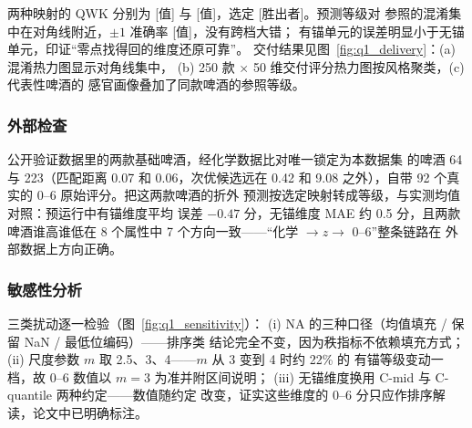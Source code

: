 \documentclass[12pt,a4paper]{article}
\begin{document}
两种映射的 QWK 分别为 [值] 与 [值]，选定 [胜出者]。预测等级对
参照的混淆集中在对角线附近，$\pm1$ 准确率 [值]，没有跨档大错；
有锚单元的误差明显小于无锚单元，印证``零点找得回的维度还原可靠''。
交付结果见图~\ref{fig:q1_delivery}：(a) 混淆热力图显示对角线集中，
(b) 250 款 $\times$ 50 维交付评分热力图按风格聚类，(c) 代表性啤酒的
感官画像叠加了同款啤酒的参照等级。


\subsubsection{外部检查}

公开验证数据里的两款基础啤酒，经化学数据比对唯一锁定为本数据集
的啤酒 64 与 223（匹配距离 0.07 和 0.06，次优候选远在 0.42 和
9.08 之外），自带 92 个真实的 0--6 原始评分。把这两款啤酒的折外
预测按选定映射转成等级，与实测均值对照：预运行中有锚维度平均
误差 $-0.47$ 分，无锚维度 MAE 约 0.5 分，且两款啤酒谁高谁低在
8 个属性中 7 个方向一致——``化学 $\to z\to$ 0--6''整条链路在
外部数据上方向正确。

\subsubsection{敏感性分析}

三类扰动逐一检验（图~\ref{fig:q1_sensitivity}）：
(i) NA 的三种口径（均值填充 / 保留 NaN / 最低位编码）——排序类
结论完全不变，因为秩指标不依赖填充方式；
(ii) 尺度参数 $m$ 取 2.5、3、4——$m$ 从 3 变到 4 时约 22\% 的
有锚等级变动一档，故 0--6 数值以 $m=3$ 为准并附区间说明；
(iii) 无锚维度换用 C-mid 与 C-quantile 两种约定——数值随约定
改变，证实这些维度的 0--6 分只应作排序解读，论文中已明确标注。

\end{document}
